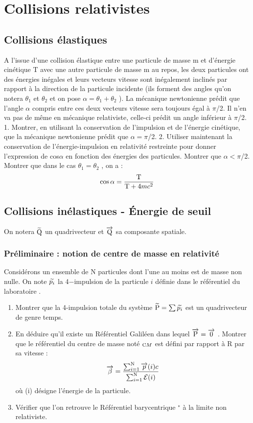 
\chapter{Collisions relativistes}%

\section{Collisions élastiques}%
A l’issue d’une collision élastique entre une particule de masse m et d’énergie cinétique T avec
une autre particule de masse m au repos, les deux particules ont des énergies inégales et leurs
vecteurs vitesse sont inégalement inclinés par rapport à la direction de la particule incidente (ils
forment des angles qu’on notera $\theta_1$ et $\theta_2$ et on pose $\alpha=\theta_1+\theta_2$ ). La mécanique newtonienne
prédit que l’angle $\alpha$ compris entre ces deux vecteurs vitesse sera toujours égal à $\pi$/2. Il n’en va
pas de même en mécanique relativiste, celle-ci prédit un angle inférieur à $\pi$/2.
1. Montrer, en utilisant la conservation de l’impulsion et de l’énergie cinétique, que la mécanique newtonienne prédit que $\alpha = \pi$/2.
2. Utiliser maintenant la conservation de l’énergie-impulsion en relativité restreinte pour donner l’expression de cos$\alpha$ en fonction des énergies des particules. Montrer que $\alpha < \pi$/2.
Montrer que dans le cas $\theta_1=\theta_2$ , on a :
\[
\cos \alpha = \frac{\text T}{{\text T} + 4mc^2}
\]
\section{Collisions inélastiques - Énergie de seuil}%
On notera $\widetilde{\text Q}$ un quadrivecteur et $\overrightarrow{\text{Q}}$ sa composante spatiale.
\subsection{Préliminaire : notion de centre de masse en relativité}%
Considérons un ensemble de N particules dont l’une au moins est de masse non nulle. On note
$\widetilde{p_i}$ la 4−impulsion de la particule $i$ définie dans le référentiel du laboratoire .
\begin{enumerate}
  \item Montrer que la 4-impulsion totale du système $\widetilde{\text P}=\sum \widetilde{p_i}$ est un quadrivecteur de genre temps.
  \item En déduire qu’il existe un Référentiel Galiléen dans lequel $\overrightarrow{\text{P}}=\overrightarrow{0}$ . Montrer que le
référentiel du centre de masse noté $_{\text CM}$ est défini par rapport à R par sa vitesse :
\[
\overrightarrow{\beta}=\frac{\sum_{i=1}^{\text N}\overrightarrow{p}(i)c}{\sum_{i=1}^{\text N}\mathcal{E}(i)}
\]
où (i) désigne l’énergie de la particule.
  \item Vérifier que l’on retrouve le Référentiel barycentrique $^∗$ à la limite non relativiste.
\end{enumerate}
